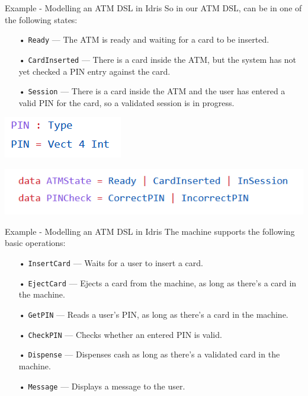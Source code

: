 \documentclass{beamer}
\newcommand{\dsltitle}{Example - Modelling an ATM DSL in Idris}
\begin{document}
\begin{frame}[fragile]{\dsltitle}
So in our ATM DSL, can be in one of the following states:
\begin{enumerate}
\item[•] \texttt{Ready} — The ATM is ready and waiting for a card to be inserted.
\item[•] \texttt{CardInserted} — There is a card inside the ATM, but the system has not yet checked a PIN entry against the card.
\item[•] \texttt{Session} — There is a card inside the ATM and the user has entered a valid PIN for the card, so a validated session is in progress.
\end{enumerate}
\begin{center}
	\includegraphics[scale=0.7]{pics/dsl-code-0}
\end{center}
\begin{center}
	\includegraphics[scale=0.7]{pics/dsl-code-1}
\end{center}
\end{frame}

\begin{frame}[fragile]{\dsltitle}
The machine supports the following basic operations:
\begin{enumerate}
\item[•] \texttt{InsertCard} — Waits for a user to insert a card.
\item[•] \texttt{EjectCard} — Ejects a card from the machine, as long as there’s a card in the machine.
\item[•] \texttt{GetPIN} — Reads a user’s PIN, as long as there’s a card in the machine.
\item[•] \texttt{CheckPIN} — Checks whether an entered PIN is valid.
\item[•] \texttt{Dispense} — Dispenses cash as long as there’s a validated card in the machine.
\item[•] \texttt{Message} — Displays a message to the user.
\end{enumerate}
\end{frame}
\end{document}
